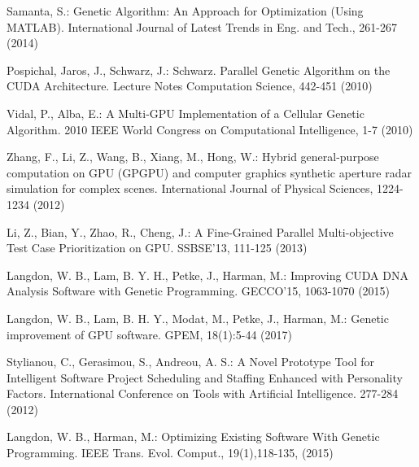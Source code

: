 \begin{thebibliography}{}
Samanta, S.:
Genetic Algorithm: An Approach for Optimization (Using MATLAB). 
International Journal of Latest Trends in Eng. and Tech., 261-267 (2014)


Pospichal, Jaros, J., Schwarz, J.:
Schwarz. Parallel Genetic Algorithm on the CUDA Architecture.
Lecture Notes Computation Science, 442-451 (2010)

Vidal, P., Alba, E.:
A Multi-GPU Implementation of a Cellular Genetic Algorithm.
2010 IEEE World Congress on Computational Intelligence, 1-7 (2010)

Zhang, F., Li, Z., Wang, B., Xiang, M., Hong, W.:
Hybrid general-purpose computation on GPU (GPGPU) and computer graphics synthetic aperture radar simulation for complex scenes.
International Journal of Physical Sciences, 1224-1234 (2012)

Li, Z., Bian, Y., Zhao, R., Cheng, J.:
A Fine-Grained Parallel Multi-objective Test Case Prioritization on GPU.
SSBSE'13, 111-125 (2013)

Langdon, W. B., Lam, B. Y. H., Petke, J., Harman, M.:
Improving CUDA DNA Analysis Software with Genetic Programming.
GECCO'15, 1063-1070 (2015)

Langdon, W. B., Lam, B. H. Y., Modat, M., Petke, J., Harman, M.:
Genetic improvement of GPU software.
GPEM, 18(1):5-44 (2017)

Stylianou, C., Gerasimou, S., Andreou, A. S.:
A Novel Prototype Tool for Intelligent Software 
Project Scheduling and Staffing Enhanced with Personality Factors.
International Conference on Tools with Artificial Intelligence. 277-284 (2012)

Langdon, W. B., Harman, M.:
Optimizing Existing Software With Genetic Programming.
IEEE Trans. Evol. Comput., 19(1),118-135, (2015)














\end{thebibliography}
\clearpage
